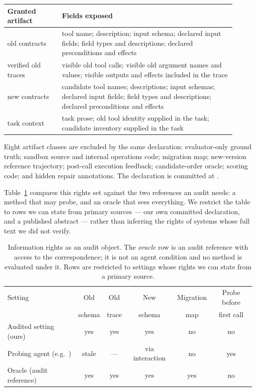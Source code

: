 \documentclass[11pt]{article}
\newcommand{\artifact}[1]{\path{#1}}
\begin{document}
\begin{center}
\small
\begin{tabular}{@{}p{0.22\linewidth}p{0.70\linewidth}@{}}
\toprule
\textbf{Granted artifact} & \textbf{Fields exposed} \\
\midrule
old contracts & tool name; description; input schema; declared input fields;
field types and descriptions; declared preconditions and effects \\
verified old traces & visible old tool calls; visible old argument names and
values; visible outputs and effects included in the trace \\
new contracts & candidate tool names; descriptions; input schemas; declared
input fields; field types and descriptions; declared preconditions and
effects \\
task context & task prose; old tool identity supplied in the task; candidate
inventory supplied in the task \\
\bottomrule
\end{tabular}
\end{center}

\medskip
Eight artifact classes are excluded by the same declaration: evaluator-only
ground truth; sandbox source and internal operations code; migration map;
new-version reference trajectory; post-call execution feedback; candidate-order
oracle; scoring code; and hidden repair annotations. The declaration is
committed at \artifact{research/gate19/information_rights.json}.

Table~\ref{tab:rights} compares this rights set against the two references an
audit needs: a method that may probe, and an oracle that sees everything. We
restrict the table to rows we can state from primary sources --- our own
committed declaration, and a published abstract --- rather than inferring the
rights of systems whose full text we did not verify.

\begin{table}[t]
\centering
\small
\caption{Information rights as an audit object. The \emph{oracle} row is an
audit reference with access to the correspondence; it is not an agent
condition and no method is evaluated under it. Rows are restricted to
settings whose rights we can state from a primary source.}
\label{tab:rights}
\begin{tabular}{@{}lccccc@{}}
\toprule
Setting & Old & Old & New & Migration & Probe before \\
        & schema & trace & schema & map & first call \\
\midrule
Audited setting (ours) & yes & yes & yes & no & no \\
Probing agent (e.g.~\cite{chen2025toolevo}) & stale & --- & via interaction & no & yes \\
Oracle (audit reference) & yes & yes & yes & yes & no \\
\bottomrule
\end{tabular}
\end{table}
\end{document}
